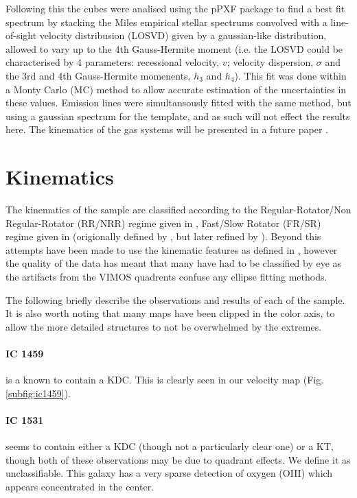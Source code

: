 \documentclass[a4paper,fleqn,usenatbib,useAMS]{mnras}
\begin{document}
		Following this the cubes were analised using the pPXF package \citep{Cappellari2004} to find a best fit spectrum by stacking the Miles empirical stellar spectrums \citep{Sanchez-Blazquez2006} convolved with a line-of-sight velocity distribusion (LOSVD) given by a gaussian-like distribution, allowed to vary up to the 4th Gauss-Hermite moment (i.e. the LOSVD could be characterised by 4 parameters: recessional velocity, $v$; velocity dispersion, $\sigma$ and the 3rd and 4th Gauss-Hermite momenents, $h_3$ and $h_4$). This fit was done within a Monty Carlo (MC) method to allow accurate estimation of the uncertainties in these values. Emission lines were simultansously fitted with the same method, but using a gaussian spectrum for the template, and as such will not effect the results here. The kinematics of the gas systems will be presented in a future paper \citep{warren2017}. %

\section{Kinematics}
	\label{sec:kine}
	The kinematics of the sample are classified according to the Regular-Rotator/Non Regular-Rotator (RR/NRR) regime given in \citet{Krajnovic2011}, Fast/Slow Rotator (FR/SR) regime given in \citet{Cappellari2016} (origionally defined by \citet{Emsellem2011}, but later refined by \citet{Cappellari2016}). Beyond this attempts have been made to use the kinematic features as defined in \citet{Krajnovic2011}, however the quality of the data has meant that many have had to be classified by eye as the artifacts from the VIMOS quadrents confuse any ellipse fitting methods. 

	The following briefly describe the observations and results of each of the sample. It is also worth noting that many maps have been clipped in the color axis, to allow the more detailed structures to not be overwhelmed by the extremes. 

	\paragraph{IC 1459} is a known to contain a KDC. This is clearly seen in our velocity map (Fig. \ref{subfig:ic1459}).

	\paragraph{IC 1531} seems to contain either a KDC (though not a particularly clear one) or a KT, though both of these observations may be due to quadrant effects. We define it as unclassifiable. This galaxy has a very sparse detection of oxygen (OIII) which appears concentrated in the center.
\end{document}
